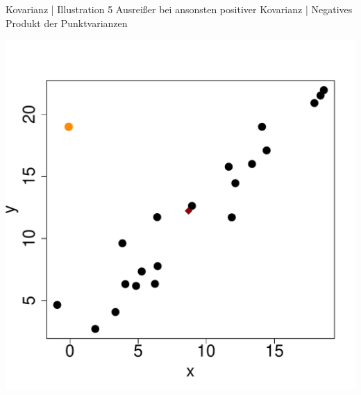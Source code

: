 \begin{frame}
  {Kovarianz | Illustration 5}
  Ausreißer bei ansonsten positiver Kovarianz | \alert{Negatives Produkt} der Punktvarianzen\\
  \begin{center}
    \includegraphics[height=0.7\textheight]{graphics/cov06}
  \end{center}
\end{frame}


